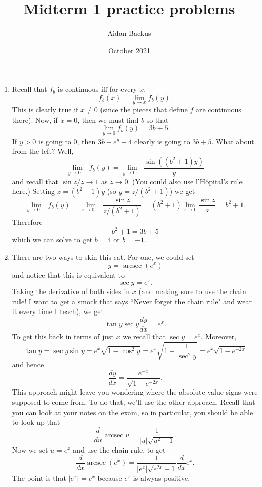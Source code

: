 \documentclass[reqno,12pt,letterpaper]{amsart}
\title{Midterm 1 practice problems}
\author{Aidan Backus}
\date{October 2021}
\DeclareMathOperator{\arcsec}{arcsec}
\theoremstyle{definition}
\numberwithin{equation}{section}
\begin{document}




\begin{enumerate}
\item Recall that $f_b$ is continuous iff for every $x$,
$$f_b(x) = \lim_{y \to x} f_b(y).$$
This is clearly true if $x \neq 0$ (since the pieces that define $f$ are continuous there).
Now, if $x = 0$, then we must find $b$ so that
$$\lim_{y \to 0} f_b(y) = 3b + 5.$$
If $y > 0$ is going to $0$, then $3b + e^y + 4$ clearly is going to $3b + 5$. What about from the left? Well,
$$\lim_{y \to 0-} f_b(y) = \lim_{y \to 0-} \frac{\sin((b^2 + 1)y)}{y}$$
and recall that $\sin z/z \to 1$ as $z \to 0$. (You could also use l'H\^opital's rule here.) Setting $z = (b^2 + 1)y$ (so $y = z/(b^2 + 1)$) we get
$$\lim_{y \to 0-} f_b(y) = \lim_{z \to 0-} \frac{\sin z}{z/(b^2 + 1)} = (b^2 + 1) \lim_{z \to 0} \frac{\sin z}{z} = b^2 + 1.$$
Therefore
$$b^2 + 1 = 3b + 5$$
which we can solve to get $b = 4$ or $b = -1$.
\item There are two ways to skin this cat. For one, we could set
$$y = \arcsec(e^x)$$
and notice that this is equivalent to
$$\sec y = e^x.$$
Taking the derivative of both sides in $x$ (and making sure to use the chain rule! I want to get a smock that says ``Never forget the chain rule" and wear it every time I teach), we get
$$\tan y \sec y \frac{dy}{dx} = e^x.$$
To get this back in terms of just $x$ we recall that $\sec y = e^x$. Moreover,
$$\tan y = \sec y \sin y = e^x \sqrt{1 - \cos^2 y} = e^x \sqrt{1 - \frac{1}{\sec^2 y}} = e^x \sqrt{1 - e^{-2x}}$$
and hence
$$\frac{dy}{dx} = \frac{e^{-x}}{\sqrt{1 - e^{-2x}}}.$$
This approach might leave you wondering where the absolute value signs were supposed to come from.
To do that, we'll use the other approach. Recall that you can look at your notes on the exam, so in particular, you should be able to look up that
$$\frac{d}{du} \arcsec u = \frac{1}{|u|\sqrt{u^2 - 1}}.$$
Now we set $u = e^x$ and use the chain rule, to get
$$\frac{d}{dx} \arcsec(e^x) = \frac{1}{|e^x| \sqrt{e^{2x} - 1}} \frac{d}{dx} e^x.$$
The point is that $|e^x| = e^x$ because $e^x$ is alwyas positive.

\end{enumerate}
\end{document}
